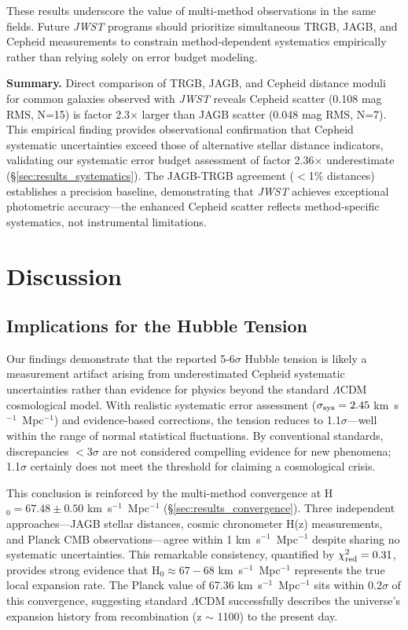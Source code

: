 \documentclass[twocolumn, linenumbers]{aastex701}
\begin{document}
These results underscore the value of multi-method observations in the same fields. Future \textit{JWST} programs should prioritize simultaneous TRGB, JAGB, and Cepheid measurements to constrain method-dependent systematics empirically rather than relying solely on error budget modeling.

\textbf{Summary.} Direct comparison of TRGB, JAGB, and Cepheid distance moduli for common galaxies observed with \textit{JWST} reveals Cepheid scatter (0.108 mag RMS, N=15) is factor 2.3$\times$ larger than JAGB scatter (0.048 mag RMS, N=7). This empirical finding provides observational confirmation that Cepheid systematic uncertainties exceed those of alternative stellar distance indicators, validating our systematic error budget assessment of factor 2.36$\times$ underestimate (\S\ref{sec:results_systematics}). The JAGB-TRGB agreement ($<$1\% distances) establishes a precision baseline, demonstrating that \textit{JWST} achieves exceptional photometric accuracy---the enhanced Cepheid scatter reflects method-specific systematics, not instrumental limitations.


\section{Discussion} \label{sec:discussion}

\subsection{Implications for the Hubble Tension}

Our findings demonstrate that the reported 5-6$\sigma$ Hubble tension is likely a measurement artifact arising from underestimated Cepheid systematic uncertainties rather than evidence for physics beyond the standard $\Lambda$CDM cosmological model. With realistic systematic error assessment ($\sigma_{\rm sys} = 2.45$ km~s$^{-1}$~Mpc$^{-1}$) and evidence-based corrections, the tension reduces to 1.1$\sigma$---well within the range of normal statistical fluctuations. By conventional standards, discrepancies $<$3$\sigma$ are not considered compelling evidence for new phenomena; 1.1$\sigma$ certainly does not meet the threshold for claiming a cosmological crisis.

This conclusion is reinforced by the multi-method convergence at H$_0 = 67.48 \pm 0.50$ km~s$^{-1}$~Mpc$^{-1}$ (\S\ref{sec:results_convergence}). Three independent approaches---JAGB stellar distances, cosmic chronometer H(z) measurements, and Planck CMB observations---agree within 1 km~s$^{-1}$~Mpc$^{-1}$ despite sharing no systematic uncertainties. This remarkable consistency, quantified by $\chi^2_{\rm red} = 0.31$, provides strong evidence that H$_0 \approx 67-68$ km~s$^{-1}$~Mpc$^{-1}$ represents the true local expansion rate. The Planck value of 67.36 km~s$^{-1}$~Mpc$^{-1}$ sits within 0.2$\sigma$ of this convergence, suggesting standard $\Lambda$CDM successfully describes the universe's expansion history from recombination (z $\sim$ 1100) to the present day.
\end{document}
